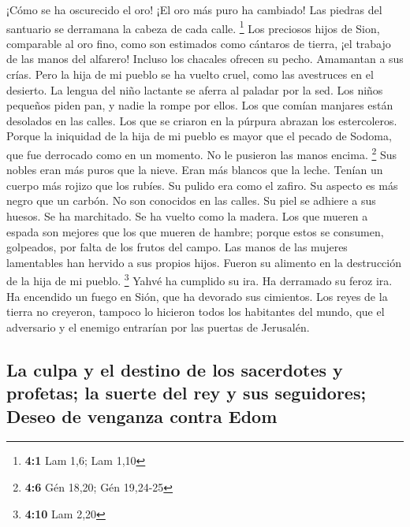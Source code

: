  ¡Cómo se ha oscurecido el oro! ¡El oro más puro ha
cambiado! Las piedras del santuario se derramana la cabeza de cada
calle. \footnote{\textbf{4:1} Lam 1,6; Lam 1,10}  Los
preciosos hijos de Sion, comparable al oro fino, como son estimados como
cántaros de tierra, ¡el trabajo de las manos del alfarero!
 Incluso los chacales ofrecen su pecho. Amamantan a sus
crías. Pero la hija de mi pueblo se ha vuelto cruel, como las avestruces
en el desierto.  La lengua del niño lactante se aferra al
paladar por la sed. Los niños pequeños piden pan, y nadie la rompe por
ellos.  Los que comían manjares están desolados en las
calles. Los que se criaron en la púrpura abrazan los estercoleros.
 Porque la iniquidad de la hija de mi pueblo es mayor que
el pecado de Sodoma, que fue derrocado como en un momento. No le
pusieron las manos encima. \footnote{\textbf{4:6} Gén 18,20; Gén
  19,24-25}  Sus nobles eran más puros que la nieve. Eran
más blancos que la leche. Tenían un cuerpo más rojizo que los rubíes. Su
pulido era como el zafiro.  Su aspecto es más negro que un
carbón. No son conocidos en las calles. Su piel se adhiere a sus huesos.
Se ha marchitado. Se ha vuelto como la madera.  Los que
mueren a espada son mejores que los que mueren de hambre; porque estos
se consumen, golpeados, por falta de los frutos del campo.
 Las manos de las mujeres lamentables han hervido a sus
propios hijos. Fueron su alimento en la destrucción de la hija de mi
pueblo. \footnote{\textbf{4:10} Lam 2,20}  Yahvé ha
cumplido su ira. Ha derramado su feroz ira. Ha encendido un fuego en
Sión, que ha devorado sus cimientos.  Los reyes de la
tierra no creyeron, tampoco lo hicieron todos los habitantes del mundo,
que el adversario y el enemigo entrarían por las puertas de Jerusalén.

\hypertarget{la-culpa-y-el-destino-de-los-sacerdotes-y-profetas-la-suerte-del-rey-y-sus-seguidores-deseo-de-venganza-contra-edom}{%
\subsection{La culpa y el destino de los sacerdotes y profetas; la
suerte del rey y sus seguidores; Deseo de venganza contra
Edom}\label{la-culpa-y-el-destino-de-los-sacerdotes-y-profetas-la-suerte-del-rey-y-sus-seguidores-deseo-de-venganza-contra-edom}}

